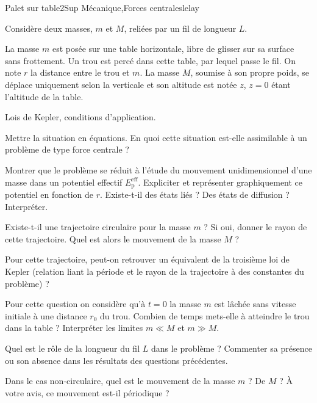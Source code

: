 
\begin{exercise}{Palet sur table}{2}{Sup}
{Mécanique,Forces centrales}{lelay}

Considère deux masses, $m$ et $M$, reliées par un fil de longueur $L$.

La masse $m$ est posée sur une table horizontale, libre de glisser sur sa surface sans frottement. Un trou est percé dans cette table, par lequel passe le fil. On note $r$ la distance entre le trou et $m$. La masse $M$, soumise à son propre poids, se déplace uniquement selon la verticale et son altitude est notée $z$, $z=0$ étant l'altitude de la table.

\begin{questions}

    \questioncours Lois de Kepler, conditions d'application.
    
    \question Mettre la situation en équations. En quoi cette situation est-elle assimilable à un problème de type force centrale ?
    
    \question Montrer que le problème se réduit à l'étude du mouvement unidimensionnel d'une masse dans un potentiel effectif $E_{\text{p}}^{\text{eff}}$. Expliciter et représenter graphiquement ce potentiel en fonction de $r$. Existe-t-il des états liés ? Des états de diffusion ? Interpréter.
    
    \question Existe-t-il une trajectoire circulaire pour la masse $m$ ? Si oui, donner le rayon de cette trajectoire. Quel est alors le mouvement de la masse $M$ ?
    
    \question Pour cette trajectoire, peut-on retrouver un équivalent de la troisième loi de Kepler (relation liant la période et le rayon de la trajectoire à des constantes du problème) ?
    
    \question Pour cette question on considère qu'à $t = 0$ la masse $m$ est lâchée sans vitesse initiale à une distance $r_0$ du trou. Combien de temps mets-elle à atteindre le trou dans la table ? Interpréter les limites $m \ll M$ et $m \gg M$.
    
    \questionbonus Quel est le rôle de la longueur du fil $L$ dans le problème ? Commenter sa présence ou son absence dans les résultats des questions précédentes.
    
    \questionbonus Dans le cas non-circulaire, quel est le mouvement de la masse $m$ ? De $M$ ? À votre avis, ce mouvement est-il périodique ?
 \end{questions}

\end{exercise}

